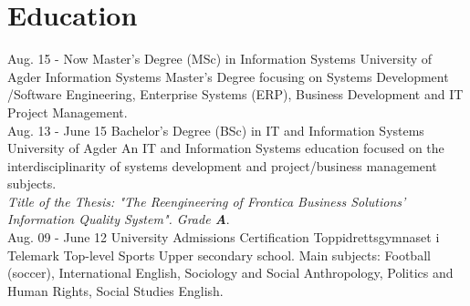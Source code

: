 \documentclass[]{cv-class}
\begin{document}
\section{Education}
\begin{entrylist}
  \entry
    {Aug. 15 - Now}
    {Master's Degree (MSc) in Information Systems}
    {University of Agder}
    {Information Systems Master's Degree focusing on Systems Development
    /Software Engineering, Enterprise Systems (ERP), Business Development and 
    IT Project Management.\\}
  \entry
    {Aug. 13 - June 15}
    {Bachelor's Degree (BSc) in IT and Information Systems}
    {University of Agder}
    {An IT and Information Systems education focused on the interdisciplinarity of
    systems development and project/business management subjects.\\
    \emph{Title of the Thesis: "The Reengineering of Frontica Business Solutions' 
    Information Quality System". Grade \textbf{A}}.\\}
  \entry
    {Aug. 09 - June 12}
    {University Admissions Certification}
    {Toppidrettsgymnaset i Telemark}
    {Top-level Sports Upper secondary school.
    Main subjects: Football (soccer), International English, Sociology and Social Anthropology,
    Politics and Human Rights, Social Studies English.}
\end{entrylist}
\end{document}

